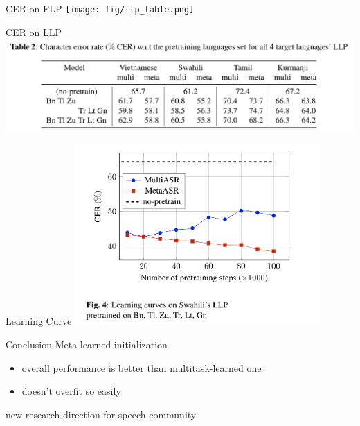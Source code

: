 \documentclass{beamer}
\begin{document}
\begin{frame}[t]{CER on FLP}
  \center \texttt{[image: fig/flp\_table.png]}
\end{frame}

\begin{frame}[t]{CER on LLP}
  \center \includegraphics[width=1.0\textwidth]{fig/llp_table.png}
\end{frame}

\begin{frame}[t]{Learning Curve}
  \center \includegraphics[width=0.7\textwidth]{fig/lr.png}
\end{frame}

\begin{frame}[t]{Conclusion}
  Meta-learned initialization
  \begin{itemize}
    \item overall performance is better than multitask-learned one
    \item doesn't overfit so easily
  \end{itemize}
  \pause
  \vspace{3em}
  \center new research direction for speech community
\end{frame}


\end{document}
